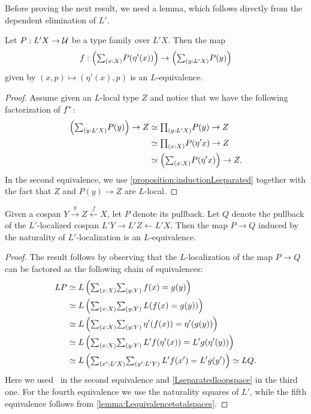 Before proving the next result,
we need a lemma, which follows directly from the dependent elimination of $L'$.

\begin{lem}\label{lemma:Lequivalencetotalspaces}
Let $P:L'X\to \mathcal{U}$ be a type family over $L'X$. 
Then the map
\begin{equation*}
f:\Big(\sm{x:X} P(\eta'(x))\Big)\to \Big(\sm{y:L'X}P(y)\Big)
\end{equation*}
given by $(x,p)\mapsto (\eta'(x),p)$ is an $L$-equivalence. 
\end{lem}

\begin{proof}
Assume given an $L$-local type $Z$ and notice that we have the following factorization of ${f}^\ast$:
    \begin{align*}
        \left(\sm{y : L'X} P(y)\right) \to Z &\simeq \prd{y : L'X} P(y) \to Z\\
                                         &\simeq \prd{x : X} P(\eta' x) \to Z \\
                                         &\simeq \left(\sm{x:X} P(\eta' x)\right) \to Z .
    \end{align*}
In the second equivalence, we use \cref{proposition:inductionLseparated} together with the fact
that $Z$ and $P(y) \to Z$ are $L$-local.
\end{proof}

\begin{prop}\label{remark:preservationpullbacks} %
    Given a cospan $Y \stackrel{g}{\longrightarrow} Z \stackrel{f}{\longleftarrow} X$, let $P$ denote its pullback.
    Let $Q$ denote the pullback of the $L'$-localized cospan $L'Y \rightarrow L'Z \leftarrow L'X$.
    Then the map $P \to Q$ induced by the naturality of $L'$-localization is an $L$-equivalence.
\end{prop}
\begin{proof}
    The result follows by observing that the $L$-localization of the map $P \to Q$
    can be factored as the following chain of equivalences:
    \begin{align*}
         LP &\simeq L \left( \sm{x:X}\sm{y:Y} \, f(x) = g(y)\right)\\
            &\simeq L \left( \sm{x:X}\sm{y:Y} \, L (f(x) = g(y))\right)\\
            &\simeq L \left( \sm{x:X}\sm{y:Y} \, \eta'(f(x)) = \eta'(g(y))\right)\\
            &\simeq L \left( \sm{x:X}\sm{y:Y} \, L'f(\eta'(x)) = L'g(\eta'(y))\right)\\
            &\simeq L \left( \sm{x':L'X}\sm{y':L'Y} \, L'f(x') = L'g(y')\right) \simeq LQ .
    \end{align*}
    Here we used~\cite[Theorem~1.24]{RijkeShulmanSpitters} in the second equivalence and \cref{Lseparatedloopspace} in the third one.
    For the fourth equivalence we use the naturality squares of $L'$, while the fifth equivalence
    follows from \cref{lemma:Lequivalencetotalspaces}.
\end{proof}

